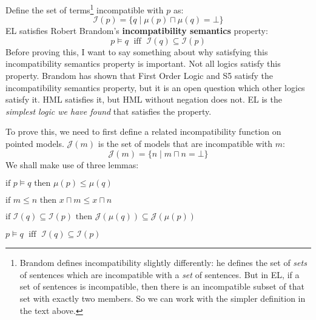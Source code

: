 Define the set of terms\footnote{Brandom \cite{brandom} defines incompatibility slightly differently: he defines the set of \emph{sets} of sentences which are incompatible with a \emph{set} of sentences. 
But in EL, if a set of sentences is incompatible, then there is an incompatible subset of that set with exactly two members.
So we can work with the simpler definition in the text above.}
 incompatible with $p$ as:
\[
\mathcal{I}(p) = \{ q \; | \; \mu(p) \sqcap \mu(q) = \bot \}
\]
EL satisfies Robert Brandom's \textbf{incompatibility semantics}  property:
\[
p \models q \; \mbox{ iff } \; \mathcal{I}(q) \subseteq \mathcal{I}(p)
\]
Before proving this, I want to say something about why satisfying this incompatibility semantics property is important.
Not all logics satisfy this property. 
Brandom has shown that First Order Logic and S5 satisfy the incompatibility semantics property, but it is an open question which other logics satisfy it.
HML satisfies it, but HML without negation does not.
EL is the \emph{simplest logic we have found} that satisfies the property.

To prove this, we need to first define a related incompatibility function on pointed models.
$\mathcal{J}(m)$ is the set of models that are incompatible with $m$:
\[
\mathcal{J}(m) = \{ n \; | \; m \sqcap n = \bot \}
\]
We shall make use of three lemmas:
\begin{lemma}
$\mbox{if }p \models q \mbox{ then } \mu(p) \leq \mu(q)$
\end{lemma}
\begin{lemma}
$\mbox{if }m \leq n \mbox{ then } x \sqcap m \leq x \sqcap n$
\end{lemma}
\begin{lemma}
$\mbox{if }\mathcal{I}(q) \subseteq \mathcal{I}(p) \mbox{ then } \mathcal{J}(\mu(q)) \subseteq \mathcal{J}(\mu(p))$
\end{lemma}

\begin{theorem}
$p \models q \; \mbox{ iff } \; \mathcal{I}(q) \subseteq \mathcal{I}(p)$
\end{theorem}


